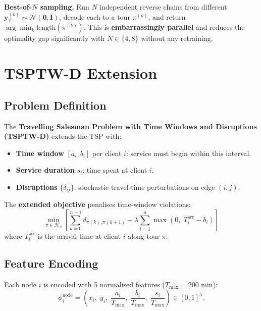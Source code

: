 \documentclass[12pt,a4paper]{article}
\begin{document}
\textbf{Best-of-$N$ sampling.}
Run $N$ independent reverse chains from different
$\mathbf{y}_T^{(k)} \sim \mathcal{N}(\mathbf{0},\mathbf{I})$,
decode each to a tour $\pi^{(k)}$, and return
$\arg\min_k \mathrm{length}(\pi^{(k)})$.
This is \textbf{embarrassingly parallel} and reduces the optimality gap
significantly with $N \in \{4, 8\}$ without any retraining.

\section{TSPTW-D Extension}

\subsection{Problem Definition}

The \textbf{Travelling Salesman Problem with Time Windows and Disruptions
(TSPTW-D)} extends the TSP with:
\begin{itemize}[leftmargin=1.5em]
  \item \textbf{Time window} $[a_i, b_i]$ per client $i$: service must begin
    within this interval.
  \item \textbf{Service duration} $s_i$: time spent at client $i$.
  \item \textbf{Disruptions} $\{\delta_{ij}\}$: stochastic travel-time
    perturbations on edge $(i,j)$.
\end{itemize}

The \textbf{extended objective} penalises time-window violations:
\begin{equation}
  \min_{\pi \in \mathcal{H}_n}\left[
    \sum_{k=0}^{n-1} d_{\pi(k),\pi(k+1)}
    + \lambda\sum_{i=1}^n \max\!\left(0,\; T_i^{\mathrm{arr}} - b_i\right)
  \right]
  \label{eq:tsptwd_obj}
\end{equation}
where $T_i^{\mathrm{arr}}$ is the arrival time at client $i$ along tour $\pi$.

\subsection{Feature Encoding}

Each node $i$ is encoded with 5 normalised features ($T_{\max} = 200$ min):
\begin{equation}
  \phi_i^{\mathrm{node}}
  = \left(x_i,\; y_i,\; \frac{a_i}{T_{\max}},\; \frac{b_i}{T_{\max}},\;
    \frac{s_i}{T_{\max}}\right) \in [0,1]^5.
  \label{eq:node_feats}
\end{equation}
\end{document}

